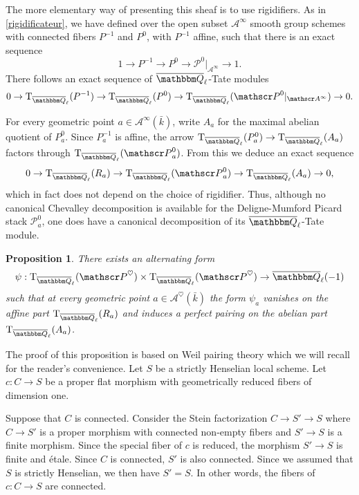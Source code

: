 \documentclass[12pt,english]{smfart}
\numberwithin{equation}{subsection}
\newtheorem{proposition}[equation]{Proposition}
\theoremstyle{remark}
\newcommand\calA{{\mathscr A}}
\newcommand\calP{{\mathscr P}}
\newcommand\rmT{{\rm T}}
\newcommand\QQ{{\mathbbm Q}}
\newcommand\Ql{{\overline\QQ_\ell}}
\begin{document}
The more elementary way of presenting this sheaf is to use rigidifiers. As in \ref{rigidificateur}, we have defined over the open subset $\calA^\infty$ smooth group schemes with connected fibers $P^{-1}$ and $P^0$, with $P^{-1}$ affine, such that there is an exact sequence
$$1\rightarrow P^{-1}\rightarrow P^0\rightarrow \calP^0|_{\calA^\infty}\rightarrow 1.$$
There follows an exact sequence of $\Ql$-Tate modules
$$0\rightarrow \rmT_\Ql(P^{-1})\rightarrow \rmT_\Ql(P^0)\rightarrow \rmT_\Ql(\calP^0|_{\calA^\infty})\rightarrow 0.$$

For every geometric point $a\in\calA^\infty(\bar k)$, write $A_a$ for the maximal abelian quotient of $P^0_a$. Since $P^{-1}_a$ is affine, the arrow $\rmT_\Ql(P^0_a)\rightarrow \rmT_\Ql(A_a)$ factors through $\rmT_\Ql(\calP_a^0)$. From this we deduce an exact sequence
$$0\rightarrow \rmT_\Ql(R_a)\rightarrow \rmT_\Ql(\calP_a^0)\rightarrow \rmT_\Ql(A_a)\rightarrow 0,$$
which in fact does not depend on the choice of rigidifier. Thus, although no canonical Chevalley decomposition is available for the Deligne-Mumford Picard stack $\calP_a^0$, one does have a canonical decomposition of its $\Ql$-Tate module.

\begin{proposition}\label{T ell P est polarisable}
There exists an alternating form
$$\psi:\rmT_\Ql(\calP^\heartsuit)\times \rmT_\Ql(\calP^\heartsuit)\rightarrow \Ql(-1)$$
such that at every geometric point $a\in\calA^\heartsuit(\bar k)$ the form $\psi_a$ vanishes on the affine part $\rmT_\Ql(R_a)$ and induces a perfect pairing on the abelian part $\rmT_\Ql(A_a)$.
\end{proposition}

The proof of this proposition is based on Weil pairing theory which we will recall for the reader's convenience. Let $S$ be a strictly Henselian local scheme. Let $c:C\rightarrow S$ be a proper flat morphism with geometrically reduced fibers of dimension one.

Suppose that $C$ is connected. Consider the Stein factorization $C\rightarrow S'\rightarrow S$ where $C\rightarrow S'$ is a proper morphism with connected non-empty fibers and $S'\rightarrow S$ is a finite morphism. Since the special fiber of $c$ is reduced, the morphism $S'\rightarrow S$ is finite and \'etale. Since $C$ is connected, $S'$ is also connected. Since we assumed that $S$ is strictly Henselian, we then have $S'=S$. In other words, the fibers of $c:C\rightarrow S$ are connected.
\end{document}
